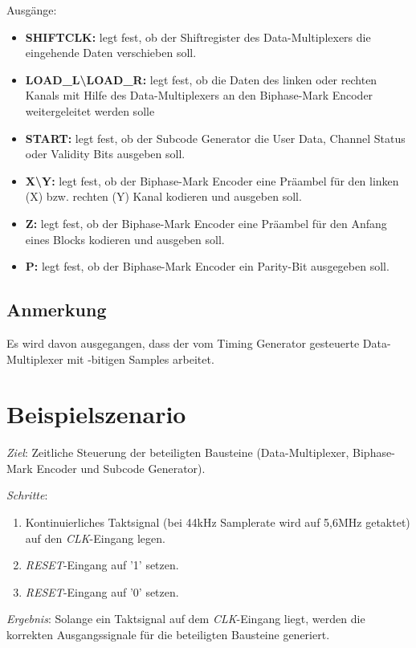 \documentclass[12pt,a4paper]{article}
\begin{document}
Ausgänge:
\begin {itemize}
\item {\bf SHIFTCLK:} legt fest, ob der Shiftregister des Data-Multiplexers die eingehende Daten verschieben soll.
\item {\bf LOAD\_L\textbackslash LOAD\_R:} legt fest, ob die Daten des linken oder rechten Kanals mit Hilfe des Data-Multiplexers an den Biphase-Mark Encoder weitergeleitet werden solle
\item {\bf START:} legt fest, ob der Subcode Generator die User Data, Channel Status oder Validity Bits ausgeben soll.
\item {\bf X\textbackslash Y:} legt fest, ob der Biphase-Mark Encoder eine Präambel für den linken (X) bzw. rechten (Y) Kanal kodieren und ausgeben soll.
\item {\bf Z:} legt fest, ob der Biphase-Mark Encoder eine Präambel für den Anfang eines Blocks kodieren und ausgeben soll.
\item {\bf P:} legt fest, ob der Biphase-Mark Encoder ein Parity-Bit ausgegeben soll.
\end{itemize}
\subsection*{Anmerkung}
Es wird davon ausgegangen, dass der vom Timing Generator gesteuerte Data-Multiplexer mit -bitigen Samples arbeitet.
\section{Beispielszenario}
\emph{Ziel}: Zeitliche Steuerung der beteiligten Bausteine (Data-Multiplexer, Biphase-Mark Encoder und Subcode Generator).

\emph{Schritte}:
\begin{enumerate}
\item Kontinuierliches Taktsignal (bei 44kHz Samplerate wird auf 5,6MHz getaktet) auf den \emph{CLK}-Eingang legen.
\item \emph{RESET}-Eingang auf '1' setzen.
\item \emph{RESET}-Eingang auf '0' setzen.
\end{enumerate}

\emph{Ergebnis}: Solange ein Taktsignal auf dem \emph{CLK}-Eingang liegt, werden die korrekten Ausgangssignale für die beteiligten Bausteine generiert.
\end{document}
